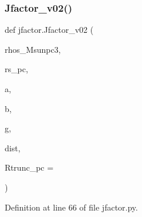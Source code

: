 \subsubsection{\texorpdfstring{Jfactor\+\_\+v02()}{Jfactor\_v02()}}
{\footnotesize\ttfamily def jfactor.\+Jfactor\+\_\+v02 (\begin{DoxyParamCaption}\item[{}]{rhos\+\_\+\+Msunpc3,  }\item[{}]{rs\+\_\+pc,  }\item[{}]{a,  }\item[{}]{b,  }\item[{}]{g,  }\item[{}]{dist,  }\item[{}]{Rtrunc\+\_\+pc = {} }\end{DoxyParamCaption})}



Definition at line 66 of file jfactor.\+py.


